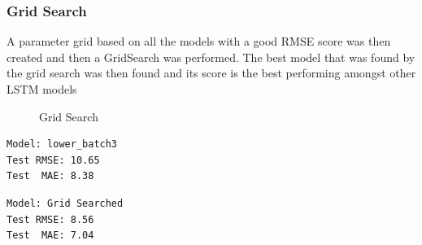 \documentclass[10pt,11pt,12pt,oneside]{book}
\begin{document}
\subsubsection{Grid Search}
A parameter grid based on all the models with a good RMSE score was then created and then a GridSearch was performed. The best model that was found by the grid search was then found and its score is the best performing amongst other LSTM models\\
\begin{figure}[H]
    \centering
    \qquad
    \caption{Grid Search}%
    \label{fig:grid}%
\end{figure}
\begin{multicols}{2}
\centering
\begin{verbatim}
Model: lower_batch3
Test RMSE: 10.65
Test  MAE: 8.38
\end{verbatim}
\begin{verbatim}
Model: Grid Searched
Test RMSE: 8.56
Test  MAE: 7.04
\end{verbatim}
\end{multicols}
\end{document}
